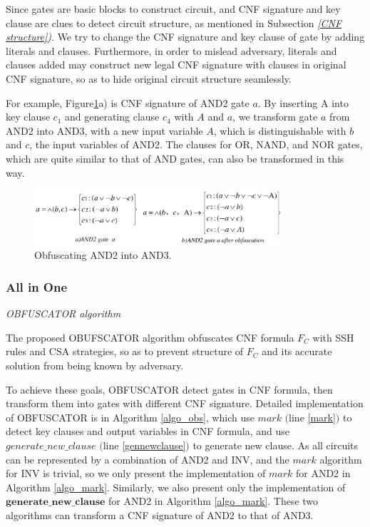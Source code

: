 \documentclass[conference,compsocconf]{IEEEtran}
\begin{document}
Since gates are basic blocks to construct circuit, 
and CNF signature and key clause are clues to detect circuit structure, 
as mentioned in Subsection \textit{\ref{CNF structure})}.
We try to change the CNF signature and key clause of gate by adding literals and clauses.
Furthermore, in order to mislead adversary, 
literals and clauses added may construct new legal CNF signature with clauses in original CNF signature, 
so as to hide original circuit structure seamlessly.

For example, Figure\ref{fig_AND2}a) is CNF signature of AND2 gate $a$.
By inserting A into key clause $c_1$ and generating clause $c_4$ with $A$ and $a$, 
we transform gate $a$ from AND2 into AND3, with a new input variable $A$, 
which is distinguishable with $b$ and $c$, the input variables of AND2.
The clauses for OR, NAND, and NOR gates, 
which are quite similar to that of AND gates,
can also be transformed in this way. 

\begin{figure}
\footnotesize\centering
\centerline{\includegraphics[width=9.2cm]{AND2.eps}}
\caption{Obfuscating AND2 into AND3.}\centering
\label{fig_AND2}
\end{figure}

\subsubsection{All in One}\textsl{OBFUSCATOR algorithm}

The proposed OBUFSCATOR algorithm obfuscates CNF formula $F_C$ with SSH rules and CSA strategies, 
so as to prevent structure of $F_C$ and its accurate solution from being known by adversary.

To achieve these goals, OBFUSCATOR detect gates in CNF formula, 
then transform them into gates with different CNF signature.
Detailed implementation of OBFUSCATOR is in Algorithm \ref{algo_obs}, which use $mark$ $($line \ref{mark}$)$ to detect key clauses and output variables  in CNF formula, 
and use $generate\_new\_clause$ $($line \ref{gennewclause}$)$ to generate new clause.
As all circuits can be represented by a combination of AND2 and INV, 
and the $mark$ algorithm for INV is trivial, 
so we only present the implementation of $mark$ for AND2 in Algorithm \ref{algo_mark}.
Similarly, we also present only the implementation of $\mathbf{generate\_new\_clause}$ for AND2 in Algorithm \ref{algo_mark}.
These two algorithms can transform a CNF signature of AND2 to that of AND3.
\end{document}
